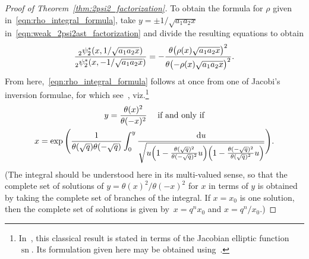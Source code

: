 \documentclass[pdftex]{sigma}
\numberwithin{equation}{section}
\newcommand{\dd}{\mathrm{d}}
\begin{document}
\begin{proof}[Proof of Theorem~\ref{thm:2psi2_factorization}]
To obtain the formula for $\rho$ given in~\eqref{eqn:rho_integral_formula}, take $y=\pm1/\sqrt{a_1a_2x}$ in~\eqref{eqn:weak_2psi2ast_factorization} and divide the resulting equations to obtain
\[ {_2^{}\psi_2^\ast(x,1/\sqrt{a_1a_2x}) \over _2^{}\psi_2^\ast(x,-1/\sqrt{a_1a_2x})} = -{\theta \bigl( \rho(x)\sqrt{a_1a_2x} \bigr)^2 \over \theta \bigl({-}\rho(x)\sqrt{a_1a_2x} \bigr)^2}. \]
From here,~\eqref{eqn:rho_integral_formula} follows at once from one of Jacobi's inversion formulae, for which see~\cite[p.~480]{Whittaker1927}, viz.\footnote{In~\cite{Whittaker1927}, this classical result is stated in terms of the Jacobian elliptic function $\operatorname{sn}$. Its formulation given here may be obtained using~\cite[equation~(A), p.~492]{Whittaker1927}.}
\begin{gather*}
 y = {\theta(x)^2 \over \theta(-x)^2} \quad\; \text{if and only if} \\
 x = \exp \Bigg( {1 \over \theta(\sqrt{q})\theta(-\sqrt{q})} \int_0^y {\dd u \over \sqrt{u\Bigl( 1-{\theta(\sqrt{q})^2 \over \theta(-\sqrt{q})^2}u\Bigr)\Bigl( 1-{\theta(-\sqrt{q})^2 \over \theta(\sqrt{q})^2}u\Bigr)}} \Bigg).
 \end{gather*}
(The integral should be understood here in its multi-valued sense, so that the complete set of solutions of $y=\theta(x)^2/\theta(-x)^2$ for $x$ in terms of $y$ is obtained by taking the complete set of branches of the integral. If $x=x_0$ is one solution, then the complete set of solutions is given by~${x=q^n x_0}$ and $x=q^n/x_0$.)


\end{proof}
\end{document}
